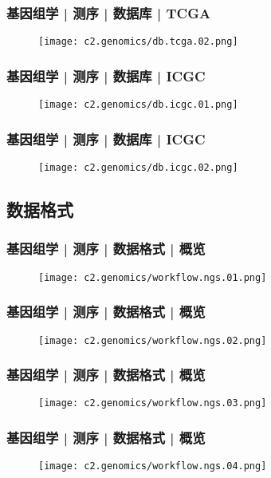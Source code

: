 \begin{frame}
  \frametitle{基因组学 | 测序 | 数据库 | TCGA}
  \begin{figure}
    \centering
    \texttt{[image: c2.genomics/db.tcga.02.png]}
  \end{figure}
\end{frame}

\begin{frame}
  \frametitle{基因组学 | 测序 | 数据库 | ICGC}
  \begin{figure}
    \centering
    \texttt{[image: c2.genomics/db.icgc.01.png]}
  \end{figure}
\end{frame}
    
\begin{frame}
  \frametitle{基因组学 | 测序 | 数据库 | ICGC}
  \begin{figure}
    \centering
    \texttt{[image: c2.genomics/db.icgc.02.png]}
  \end{figure}
\end{frame}
    
\subsection{数据格式}
\begin{frame}
  \frametitle{基因组学 | 测序 | 数据格式 | 概览}
  \begin{figure}
    \centering
    \texttt{[image: c2.genomics/workflow.ngs.01.png]}
  \end{figure}
\end{frame}
    
\begin{frame}
  \frametitle{基因组学 | 测序 | 数据格式 | 概览}
  \begin{figure}
    \centering
    \texttt{[image: c2.genomics/workflow.ngs.02.png]}
  \end{figure}
\end{frame}
    
\begin{frame}
  \frametitle{基因组学 | 测序 | 数据格式 | 概览}
  \begin{figure}
    \centering
    \texttt{[image: c2.genomics/workflow.ngs.03.png]}
  \end{figure}
\end{frame}
    
\begin{frame}
  \frametitle{基因组学 | 测序 | 数据格式 | 概览}
  \begin{figure}
    \centering
    \texttt{[image: c2.genomics/workflow.ngs.04.png]}
  \end{figure}
\end{frame}

